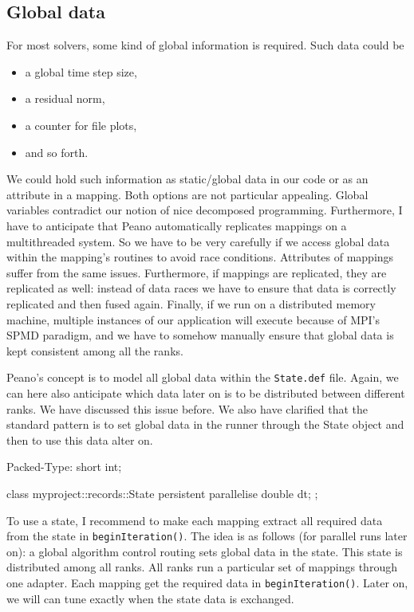 \subsection{Global data}

For most solvers, some kind of global information is required. 
Such data could be 
\begin{itemize}
  \item a global time step size,
  \item a residual norm,
  \item a counter for file plots, 
  \item and so forth.
\end{itemize}

\noindent
We could hold such information as static/global data in our code or as an
attribute in a mapping. 
Both options are not particular appealing. 
Global variables contradict our notion of nice decomposed programming.
Furthermore, I have to anticipate that Peano automatically replicates mappings
on a multithreaded system. 
So we have to be very carefully if we access global data within the mapping's
routines to avoid race conditions.
Attributes of mappings suffer from the same issues.
Furthermore, if mappings are replicated, they are replicated as well: 
instead of data races we have to ensure that data is correctly replicated and
then fused again. 
Finally, if we run on a distributed memory machine, multiple instances of our
application will execute because of MPI's SPMD paradigm, and we have to somehow
manually ensure that global data is kept consistent among all the ranks.


Peano's concept is to model all global data within the \texttt{State.def} file. 
Again, we can here also anticipate which data later on is to be distributed
between different ranks. We have discussed this issue before.
We also have clarified that the standard pattern is to set global data in the
runner through the State object and then to use this data alter on.

\begin{code}
Packed-Type: short int;


class myproject::records::State {  
  persistent parallelise double dt;
};

\end{code}

To use a state, I recommend to make each mapping extract all required data from
the state in \texttt{beginIteration()}.
The idea is as follows (for parallel runs later on): a global algorithm control
routing sets global data in the state.
This state is distributed among all ranks.
All ranks run a particular set of mappings through one adapter.
Each mapping get the required data in \texttt{beginIteration()}.
Later on, we will can tune exactly when the state data is exchanged.

